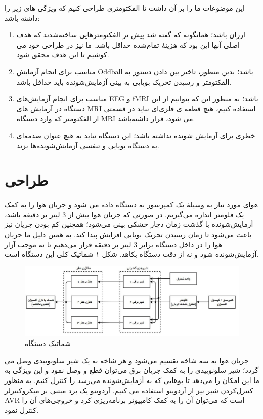 \documentclass[oneside]{report}
\begin{document}
این موضوعات ما را بر آن داشت تا الفکتومتری طراحی کنیم که ویژگی های زیر را داشته باشد:
\begin{enumerate}
\item
ارزان باشد؛ همانگونه که گفته شد پیش تر الفکتومترهایی ساخته‌شدند که هدف اصلی آنها این بود که هزینهٔ تمام‌شده حداقل باشد. ما نیز در طراحی خود می کوشیم تا این هدف محقق شود.
\item
مناسب برای انجام آزمایش Oddball باشد؛ بدین منظور، تاخیر بین دادن دستور به الفکتومتر و رسیدن تحریک بویایی به بینی آزمایش‌شونده باید حداقل باشد.
\item
مناسب برای انجام آزمایش‌های EEG و fMRI باشد؛ به منظور این که بتوانیم از این دستگاه در آزمایش های MRI استفاده کنیم، هیچ قطعه ی فلزی‌ای نباید در قسمتی از الفکتومتر که وارد دستگاه MRI می شود، قرار داشته‌باشد.
\item
خطری برای آزمایش شونده نداشته باشد؛ این دستگاه نباید به هیچ عنوان صدمه‌ای به دستگاه بویایی و تنفسی آزمایش‌شونده‌ها بزند.
\end{enumerate}



\section*{طراحی}

هوای مورد نیاز به وسیلهٔ یک کمپرسور به دستگاه داده می شود و جریان هوا را به کمک یک فلومتر اندازه می‌گیریم. در صورتی که جریان هوا بیش از 3 لیتر بر دقیقه باشد، آزمایش‌شونده با گذشت زمان دچار خشکی بینی می‌شود؛ همچنین کم بودن جریان نیز باعث می‌شود تا زمان رسیدن تحریک بویایی افزایش پیدا کند. به همین دلیل ما جریان هوا را در داخل دستگاه برابر 3 لیتر بر دقیقه قرار می‌دهیم تا نه موجب آزار آزمایش‌شونده شود و نه از دقت دستگاه بکاهد. شکل ۱ شماتیک کلی این دستگاه است.

\begin{figure}[h]
	\centering
	\includegraphics[width=1\textwidth]{sche.png}
	\caption{شماتیک دستگاه}
	\label{fig:sche1}
\end{figure}

جریان هوا به سه شاخه تقسیم می‌شود و هر شاخه به یک شیر سلونوییدی وصل می گردد؛ شیر سلونوییدی را به کمک جریان برق می‌توان قطع و وصل نمود و این ویژگی به ما این امکان را می‌دهد تا بوهایی که به آزمایش‌شونده می‌رسد را کنترل کنیم. به منظور کنترل‌کردن شیر نیز از آردوینو استفاده می کنیم. آردوینو یک برد مبتنی بر میکروکنترلر AVR است که می‌توان آن را به کمک کامپیوتر برنامه‌ریزی کرد و خروجی‌های آن را کنترل نمود.
\end{document}
